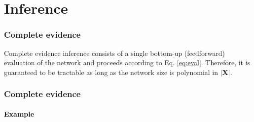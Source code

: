 \documentclass[10pt, t, xcolor={usenames,dvipsnames,svgnames}, compress]{beamer}
\begin{document}
\section{Inference}
{
  \begin{frame}[c]
    \sectionpage
  \end{frame}
}

\begin{frame}
\frametitle{Complete evidence}

Complete evidence inference consists of a single bottom-up
(feedforward) evaluation of the network and proceeds according to
Eq. \ref{eq:eval}.
%
Therefore, it is guaranteed to be tractable
as long as the network size is polynomial in $|\mathbf{X}|$.
\end{frame}

\begin{frame}
\frametitle{Complete evidence}
\framesubtitle{Example}
\begin{center}
\end{center}
\end{frame}
\end{document}
